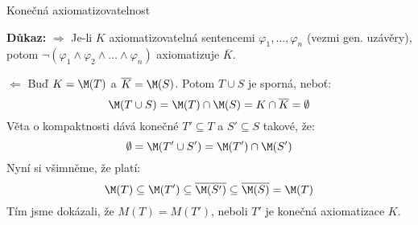 \documentclass{beamer}
\begin{document}
\begin{frame}{Konečná axiomatizovatelnost}
    
    \smallskip

    \pause

    \pause
    \textbf{Důkaz:} \alert{\Large$\Rightarrow$}
    Je-li $K$ axiomatizovatelná \alert{sentencemi} $\varphi_1,\dots,\varphi_n$ (vezmi gen. uzávěry), potom $\neg(\varphi_1\land\varphi_2\land\dots\land\varphi_n)$ axiomatizuje $\overline{K}$.\pause

    \alert{\Large$\Leftarrow$} Buď $K=\M(T)$ a $\overline{K}=\M(S)$. Potom  \alert{$T\cup S$ je sporná}, neboť:
    $$
    \M(T\cup S)=\M(T)\cap \M(S)=K\cap\overline{K}=\emptyset
    $$
    \pause \alert{Věta o kompaktnosti} dává konečné $T'\subseteq T$ a $S'\subseteq S$ takové, že:
    $$
    \emptyset = \M(T'\cup S')=\M(T')\cap \M(S')
    $$
    \pause Nyní si všimněme, že platí:
    $$
    \M(T)\subseteq \M(T')\subseteq \overline{\M(S')}\subseteq \overline{\M(S)}=\M(T)
    $$
    \pause Tím jsme dokázali, že \alert{$M(T)=M(T')$}, neboli $T'$ je konečná axiomatizace $K$. \hfill\qedsymbol

\end{frame}
\end{document}
